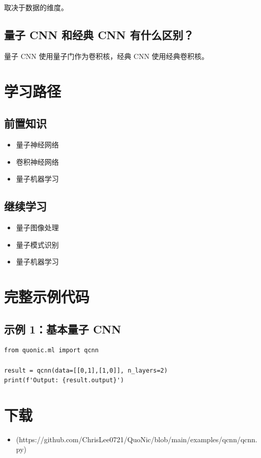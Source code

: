 \documentclass[12pt,a4paper]{article}
\begin{document}
取决于数据的维度。

\subsection{量子 CNN 和经典 CNN 有什么区别？}

量子 CNN 使用量子门作为卷积核，经典 CNN 使用经典卷积核。

\section{学习路径}

\subsection{前置知识}
\begin{itemize}
  \item 量子神经网络
  \item 卷积神经网络
  \item 量子机器学习
\end{itemize}

\subsection{继续学习}
\begin{itemize}
  \item 量子图像处理
  \item 量子模式识别
  \item 量子机器学习
\end{itemize}

\section{完整示例代码}

\subsection{示例 1：基本量子 CNN}

\begin{verbatim}
from quonic.ml import qcnn

result = qcnn(data=[[0,1],[1,0]], n_layers=2)
print(f'Output: {result.output}')
\end{verbatim}

\section{下载}

\begin{itemize}
  \item [qcnn.py](https://github.com/ChrisLee0721/QuoNic/blob/main/examples/qcnn/qcnn.py)
\end{itemize}
\end{document}
